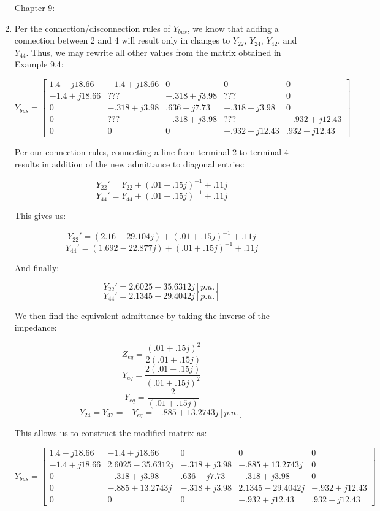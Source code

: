 \begin{enumerate}

    \begin{center}
      \underline{Chapter 9}:
    \end{center}

  \item

    Per the connection/disconnection rules of $Y_{bus}$, we know that adding a connection between 2 and 4 will result only in changes to $Y_{22}$, $Y_{24}$, $Y_{42}$, and $Y_{44}$. Thus, we may rewrite all other values from the matrix obtained in Example 9.4:

    $$Y_{bus}=\left[ \begin{matrix} 1.4-j18.66 & -1.4+j18.66 & 0 & 0 & 0\\ -1.4+j18.66 & ??? & -.318+j3.98 & ??? & 0\\ 0 & -.318+j3.98 & .636-j7.73 & -.318+j3.98 & 0\\ 0 & ??? & -.318+j3.98 & ??? & -.932+j12.43\\ 0 & 0 & 0 & -.932+j12.43 & .932-j12.43 \end{matrix} \right]$$

    Per our connection rules, connecting a line from terminal 2 to terminal 4 results in addition of the new admittance to diagonal entries:

    $$Y_{22}'=Y_{22}+(.01+.15j)^{-1}+.11j$$
    $$Y_{44}'=Y_{44}+(.01+.15j)^{-1}+.11j$$

    This gives us:

    $$Y_{22}'=(2.16-29.104j)+(.01+.15j)^{-1}+.11j$$
    $$Y_{44}'=(1.692-22.877j)+(.01+.15j)^{-1}+.11j$$

    And finally:

    $$Y_{22}'=2.6025-35.6312j[p.u.]$$
    $$Y_{44}'=2.1345-29.4042j[p.u.]$$

    We then find the equivalent admittance by taking the inverse of the impedance:

    $$Z_{eq}=\frac{(.01+.15j)^{2}}{2(.01+.15j)}$$
    $$Y_{eq}=\frac{2(.01+.15j)}{(.01+.15j)^{2}}$$
    $$Y_{eq}=\frac{2}{(.01+.15j)}$$
    $$Y_{24}=Y_{42}=-Y_{eq}=-.885+13.2743j[p.u.]$$

    This allows us to construct the modified matrix as:

    $$\boxed{Y_{bus}=\left[ \begin{matrix} 1.4-j18.66 & -1.4+j18.66 & 0 & 0 & 0\\ -1.4+j18.66 & 2.6025-35.6312j & -.318+j3.98 & -.885+13.2743j & 0\\ 0 & -.318+j3.98 & .636-j7.73 & -.318+j3.98 & 0\\ 0 & -.885+13.2743j & -.318+j3.98 & 2.1345-29.4042j & -.932+j12.43\\ 0 & 0 & 0 & -.932+j12.43 & .932-j12.43 \end{matrix} \right]}$$


\end{enumerate}
